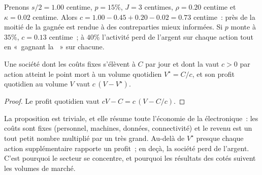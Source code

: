 \begin{example}\label{ex:m1:what-a-trading-firm-does:capture}
Prenons $s/2 = 1.00$ centime, $p = 15\%$, $J = 3$ centimes, $\rho = 0.20$ centime et
$\kappa = 0.02$ centime. Alors $c = 1.00 - 0.45 + 0.20 - 0.02 = 0.73$ centime~: près
de la moitié de la  gagnée est rendue à des contreparties mieux informées.
Si $p$ monte à $35\%$, $c = 0.13$ centime~; à $40\%$ l'activité perd de l'argent
sur chaque action tout en «~gagnant la ~» sur chacune.
\end{example}

\begin{proposition}\label{prop:m1:what-a-trading-firm-does:breakeven}
Une société dont les coûts fixes s'élèvent à $C$ par jour et dont la  vaut $c > 0$ par action atteint le point mort à un volume quotidien $V^\star = C/c$,
et son profit quotidien au volume $V$ vaut $c\,(V - V^\star)$.
\end{proposition}
\begin{proof}
Le profit quotidien vaut $cV - C = c\,(V - C/c)$.
\end{proof}

La proposition est triviale, et elle résume toute l'économie de la  électronique~: les coûts sont fixes (personnel, machines, données, connectivité) et
le revenu est un tout petit nombre multiplié par un très grand. Au-delà de $V^\star$
presque chaque action supplémentaire rapporte un profit~; en deçà, la société perd de l'argent. C'est pourquoi le secteur se
concentre, et pourquoi les résultats des  cotés
suivent les volumes de marché.

\begin{omfigure}

\end{omfigure}

